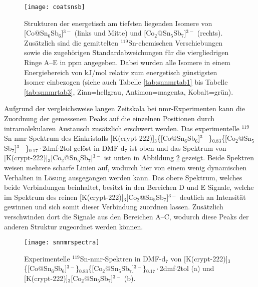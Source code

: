 \begin{figure}[ht!]
	\centering
	\texttt{[image: coatsnsb]}
	\captionsetup{figurewithin = chapter}
	\captionsetup{font=small, labelfont=bf}\caption[Strukturen von {[Co@Sn$_6$Sb$_6$]$^{3-}$ und [Co$_2$@Sn$_5$Sb$_7$]$^{3-}$}]{Strukturen der energetisch am tiefsten liegenden Isomere von [Co@Sn$_6$Sb$_6$]$^{3-}$ (links und Mitte) und [Co$_2$@Sn$_5$Sb$_7$]$^{3-}$ (rechts). Zusätzlich sind die gemittelten $^{119}$Sn-chemischen Verschiebungen sowie die zugehörigen Standardabweichungen für die viergliedrigen Ringe A--E in ppm angegeben. Dabei wurden alle Isomere in einem Energiebereich von \unit[10]{kJ/mol} relativ zum energetisch günstigsten Isomer einbezogen (siehe auch Tabelle \ref{tab:snnmrtab1} bis Tabelle \ref{tab:snnmrtab3}, Zinn=hellgrau, Antimon=magenta, Kobalt=grün).}
\label{abb:coatsnsb}
\end{figure}
\FloatBarrier
Aufgrund der vergleichsweise langen Zeitskala bei \ac{nmr}-Experimenten kann die Zuordnung der gemessenen Peaks auf die einzelnen Positionen durch intramolekularen Austausch zusätzlich erschwert werden. Das experimentelle $^{119}$Sn-\ac{nmr}-Spektrum des Einkristalls [K(crypt-222)]$_3$\{[Co@Sn$_6$Sb$_6$]$^{3-}$\}$_{0.83}$\{[Co$_2$@Sn$_5$Sb$_7$]$^{3-}$\}$_{0.17}\cdot$2dmf$\cdot$2tol gelöst in DMF-d$_7$ ist oben und das Spektrum von [K(crypt-222)]$_3$[Co$_2$@Sn$_5$Sb$_7$]$^{3-}$ ist unten in Abbildung \ref{abb:expsnnmr} gezeigt. Beide Spektren weisen mehrere scharfe Linien auf, wodurch hier von einem wenig dynamischen Verhalten in Lösung ausgegangen werden kann. Das obere Spektrum, welches beide Verbindungen beinhaltet, besitzt in den Bereichen D und E Signale, welche im Spektrum des reinen [K(crypt-222)]$_3$[Co$_2$@Sn$_5$Sb$_7$]$^{3-}$ deutlich an Intensität gewinnen und sich somit dieser Verbindung zuordnen lassen. Zusätzlich verschwinden dort die Signale aus den Bereichen A--C, wodurch diese Peaks der anderen Struktur zugeordnet werden können. 
\begin{figure}[ht!]
	\centering
	\texttt{[image: snnmrspectra]}
	\captionsetup{figurewithin = chapter}
	\captionsetup{font=small, labelfont=bf}\caption[{$^{119}$Sn-\ac{nmr}-Spektren von [Co@Sn$_6$Sb$_6$]$^{3-}$ und [Co$_2$@Sn$_5$Sb$_7$]$^{3-}$}]{Experimentelle $^{119}$Sn-\ac{nmr}-Spektren in DMF-d$_7$ von [K(crypt-222)]$_3$\{[Co@Sn$_6$Sb$_6$]$^{3-}$\}$_{0.83}$\{[Co$_2$@Sn$_5$Sb$_7$]$^{3-}$\}$_{0.17}\cdot$2dmf$\cdot$2tol \textsf{(a)} und [K(crypt-222)]$_3$[Co$_2$@Sn$_5$Sb$_7$]$^{3-}$ \textsf{(b)}.}
\label{abb:expsnnmr}
\end{figure}
\FloatBarrier

